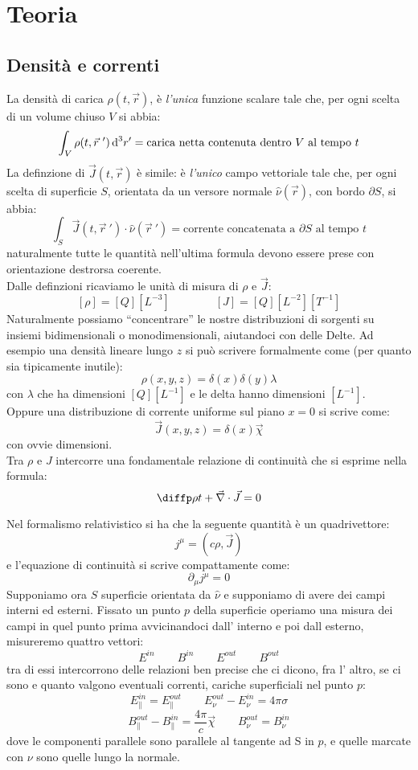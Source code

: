 \documentclass[a4paper,10pt,oneside]{math_article}
\renewcommand{\div}{\vec{\nabla} \cdot}
\begin{document}
	\section{Teoria}
	\subsection{Densità e correnti}
	La densità di carica $\rho(t,\vec r)$, è {\it l'unica} funzione scalare tale che, per ogni scelta di un volume chiuso $V$ si abbia:
	\[
		\int_V  \rho(t,\vec{r}\ ') \, \textrm{d}^3r'=\mbox{carica netta contenuta dentro $V$ al tempo $t$}
	\]
	La definzione di $\vec J(t,\vec r)$ è simile: è {\it l'unico} campo vettoriale tale che, per ogni scelta di superficie $S$, orientata da un versore normale $\hat \nu(\vec r)$, con bordo $\partial S$, si abbia:
	\[
		\int_S \vec J(t,\vec{r}\ ')\cdot \hat\nu(\vec{r}\ ')=\mbox{corrente concatenata a $\partial S$ al tempo $t$}
	\]
	naturalmente tutte le quantità nell'ultima formula devono essere prese con orientazione destrorsa coerente.\\
	Dalle definzioni ricaviamo le unità di misura di $\rho$ e $\vec J$:
	\[
		[\rho]=[Q][L^{-3}]\qquad \qquad [J]=[Q][L^{-2}][T^{-1}]
	\]
	Naturalmente possiamo ``concentrare'' le nostre distribuzioni di sorgenti su insiemi bidimensionali o monodimensionali, aiutandoci con delle Delte. Ad esempio una densità lineare lungo $\hat z$ si può scrivere formalmente come (per quanto sia tipicamente inutile):
	\[
		\rho(x,y,z)=\delta(x)\delta(y)\lambda
	\]
	con $\lambda$ che ha dimensioni $[Q][L^{-1}]$ e le delta hanno dimensioni $[L^{-1}]$.\\
	Oppure una distribuzione di corrente uniforme sul piano $x=0$ si scrive come:
	\[
		\vec J(x,y,z)=\delta(x)\vec\chi
	\]
	con ovvie dimensioni.\\
	Tra $\rho$ e $J$ intercorre una fondamentale relazione di continuità che si esprime nella formula:
	\begin{equation}
		\diffp \rho t +\div \vec J=0\label{eq:continuita}
	\end{equation}
	
	Nel formalismo relativistico si ha che la seguente quantità è un quadrivettore:
	\[
		j^\mu=\left(c\rho,\vec J\right)
	\]
	e l'equazione di continuità si scrive compattamente come:
	\[
		\partial_\mu j^\mu=0
	\]
	Supponiamo ora $S$ superficie orientata da $\hat\nu$ e supponiamo di avere dei campi interni ed esterni. Fissato un punto $p$ della superficie operiamo una misura dei campi in quel punto prima avvicinandoci dall' interno e poi dall esterno, misureremo quattro vettori:
	\[
		E^{in}\qquad B^{in}\qquad E^{out}\qquad B^{out}
	\]
	tra di essi intercorrono delle relazioni ben precise che ci dicono, fra l' altro, se ci sono e quanto valgono eventuali correnti, cariche superficiali nel punto $p$:
	\[
		E^{in}_\parallel=E^{out}_\parallel\qquad E^{out}_\nu-E^{in}_\nu=4\pi \sigma
	\]
	\[
		B^{out}_\parallel-B^{in}_\parallel=\frac{4\pi}{c}\vec\chi\qquad B^{out}_\nu=B^{in}_\nu
	\]
	dove le componenti parallele sono parallele al tangente ad S in $p$, e quelle marcate con $\nu$ sono quelle lungo la normale.
\end{document}
